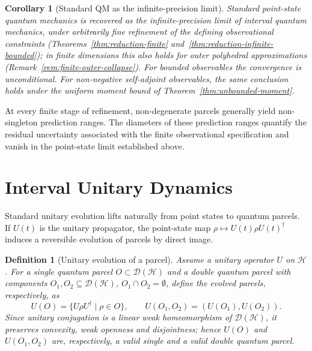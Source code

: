 \documentclass[11pt, onecolumn]{article}
\newtheorem{definition}{Definition}
\newtheorem{corollary}{Corollary}
\begin{document}
\begin{corollary}[Standard QM as the infinite-precision limit]
\label{cor:limit}
Standard point-state quantum mechanics is recovered as the infinite-precision limit of interval quantum mechanics, under arbitrarily fine refinement of the defining observational constraints (Theorems~\ref{thm:reduction-finite} and~\ref{thm:reduction-infinite-bounded}); in finite dimensions this also holds for outer polyhedral approximations (Remark~\ref{rem:finite-outer-collapse}). For bounded observables the convergence is unconditional. For non-negative self-adjoint observables, the same conclusion holds under the uniform moment bound of Theorem~\ref{thm:unbounded-moment}.
\end{corollary}

At every finite stage of refinement, non-degenerate parcels generally yield non-singleton prediction ranges. The diameters of these prediction ranges quantify the residual uncertainty associated with the finite observational specification and vanish in the point-state limit established above.


\section{Interval Unitary Dynamics}\label{sec:unitary}

Standard unitary evolution lifts naturally from point states to quantum parcels. If $U(t)$ is the unitary propagator, the point-state map $\rho\mapsto U(t)\rho U(t)^\dagger$ induces a reversible evolution of parcels by direct image.

\begin{definition}[Unitary evolution of a parcel]
\label{def:unitary}
Assume a unitary operator \(U\) on \(\mathcal{H}\). For a single quantum parcel \(O\subset\mathcal{D}(\mathcal{H})\) and a double quantum parcel with components \(O_1,O_2\subseteq\mathcal{D}(\mathcal{H})\), \(O_1\cap O_2=\emptyset\), define the evolved parcels, respectively, as
\[
U(O)=\{U\rho U^\dagger\mid\rho\in O\},\qquad U(O_1,O_2)=(U(O_1),U(O_2)).
\]
Since unitary conjugation is a linear weak homeomorphism of \(\mathcal D(\mathcal H)\), it preserves convexity, weak openness and disjointness; hence \(U(O)\) and \(U(O_1,O_2)\) are, respectively, a valid single and a valid double quantum parcel.
\end{definition}
\end{document}
